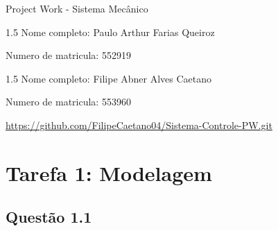 \documentclass[a4paper,11pt]{article}
\begin{document}
{\Large \noindent \sc Project Work - Sistema Mecânico} \\ %

\begin{spacing}{1.5}
{\large\sc \noindent Nome completo: Paulo Arthur Farias Queiroz}

{\large\sc \noindent Numero de matricula: 552919}
\end{spacing}

\begin{spacing}{1.5}
{\large\sc \noindent Nome completo: Filipe Abner Alves Caetano}

{\large\sc \noindent Numero de matricula: 553960}
\end{spacing}

\url{https://github.com/FilipeCaetano04/Sistema-Controle-PW.git}

\section*{\sc Tarefa 1: Modelagem}

\subsection*{\sc Questão 1.1}
\end{document}

